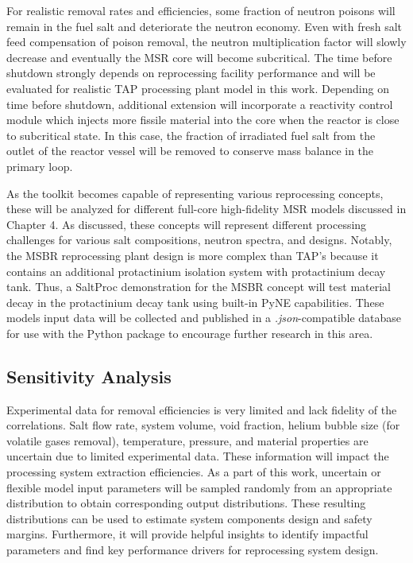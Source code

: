 For realistic removal rates and efficiencies, some fraction of neutron 
poisons will remain in the fuel salt and deteriorate the neutron 
economy. Even with fresh salt feed compensation of poison removal, 
the neutron multiplication factor will slowly decrease and 
eventually the \gls{MSR} core will become subcritical. The time before 
shutdown strongly depends on reprocessing facility performance 
and will be evaluated for realistic \gls{TAP} processing plant model 
in this work. Depending on time before shutdown, additional 
extension will 
incorporate a reactivity control module which injects more fissile 
material into the core when the reactor is close to subcritical state. 
In this case, the fraction of irradiated fuel salt from the outlet of 
the reactor vessel will be removed to conserve mass balance in the 
primary loop.

As the toolkit becomes capable of representing various reprocessing 
concepts, these will be analyzed for different full-core 
high-fidelity \gls{MSR} models discussed in Chapter 4. As discussed, 
these concepts will represent different processing challenges 
for various salt compositions, neutron spectra, and designs. 
Notably, the \gls{MSBR} reprocessing plant design is more complex 
than \gls{TAP}'s because it contains an additional protactinium 
isolation system with protactinium decay tank. Thus, a SaltProc 
demonstration for the \gls{MSBR} concept will test material decay 
in the protactinium decay tank using built-in PyNE capabilities. 
These models input data will be collected and 
published in a \textit{.json}-compatible database for use with the 
Python package to encourage further research in this area.

\subsection{Sensitivity Analysis}
Experimental data for removal efficiencies is very limited and lack 
fidelity of the correlations. Salt flow rate, system volume, 
void fraction, helium bubble size (for volatile gases removal), 
temperature, pressure, and material properties are uncertain due to 
limited experimental data. These information will impact the 
processing system extraction efficiencies. As a part of this work, 
uncertain or flexible model input parameters will be sampled randomly 
from an appropriate distribution to obtain corresponding output 
distributions. These resulting distributions can be used to estimate 
system components design and safety margins. Furthermore, it will 
provide helpful insights to identify impactful parameters and 
find key performance drivers for reprocessing system design.

